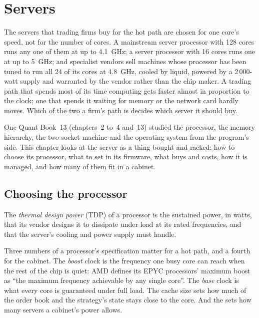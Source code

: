 \chapter{Servers}\label{ch:nw:servers}

The servers that trading firms buy for the hot path are chosen for one core's speed, not for the number of cores. A mainstream
server processor with 128 cores runs any one of them at up to 4.1~GHz; a server processor with 16 cores runs one at up to 5~GHz;
and specialist vendors sell machines whose processor has been tuned to run all 24 of its cores at 4.8~GHz, cooled by liquid,
powered by a 2\,000-watt supply and warranted by the vendor rather than the chip maker. A trading path that spends most of its time
computing gets faster almost in proportion to the clock; one that spends it waiting for memory or the network card hardly moves.
Which of the two a firm's path is decides which server it should buy.

One Quant Book~13 (chapters~2 to~4 and~13) studied the processor, the memory hierarchy, the two-socket machine and the operating
system from the program's side. This chapter looks at the server as a thing bought and racked: how to choose its processor, what to
set in its firmware, what  buys and costs, how it is managed, and how many of them fit in a cabinet.

\section{Choosing the processor}

\begin{definition}\label{def:nw:servers:tdp}
The \emph{thermal design power} (TDP) of a processor is the sustained power, in watts, that its vendor
designs it to dissipate under load at its rated frequencies, and that the server's cooling and power supply must handle.
\end{definition}

Three numbers of a processor's specification matter for a hot path, and a fourth for the cabinet. The \emph{boost} clock is the
frequency one busy core can reach when the rest of the chip is quiet: AMD defines its EPYC processors' maximum boost as ``the maximum
frequency achievable by any single core''. The \emph{base} clock is what every core is guaranteed under full load. The cache size sets
how much of the order book and the strategy's state stays close to the core. And the  sets how many servers a
cabinet's power allows.

